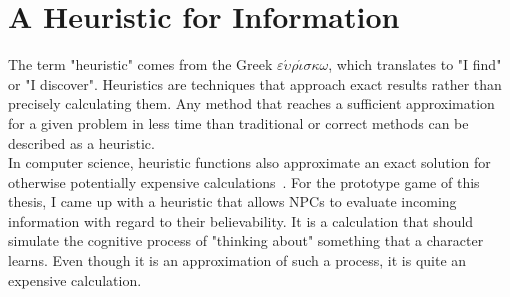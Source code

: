 \section{A Heuristic for Information}
The term "heuristic" comes from the Greek $\varepsilon\acute{\upsilon}\rho\acute{\iota}\sigma\kappa\omega$, which translates to "I find" or "I discover". Heuristics are techniques that approach exact results rather than precisely calculating them. Any method that reaches a sufficient approximation for a given problem in less time than traditional or correct methods can be described as a heuristic.~\cite{Ippoliti2015}\\
In computer science, heuristic functions also approximate an exact solution for otherwise potentially expensive calculations~\cite{Pearl1984}. For the prototype game of this thesis, I came up with a heuristic that allows NPCs to evaluate incoming information with regard to their believability. It is a calculation that should simulate the cognitive process of "thinking about" something that a character learns. Even though it is an approximation of such a process, it is quite an expensive calculation. 
